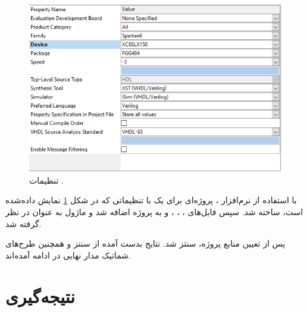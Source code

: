 \documentclass[conference]{IEEEtran-ModifiedForMVIP}
\begin{document}
\begin{figure}[t]
\centering
\includegraphics[width=\linewidth]{Images/FPGASettings.png}
\caption{
\centering
تنظیمات
.
}\label{fig:FPGASettings}
\end{figure}

با استفاده از نرم‌افزار
،
پروژه‌ای برای یک
با تنظیماتی که در شکل
\ref{fig:FPGASettings}
نمایش داده‌شده است، ساخته شد.
سپس فایل‌های
،
،
،
و
به
پروژه اضافه شد و
ماژول
به عنوان
در نظر گرفته شد.

پس از تعیین منابع پروژه،
سنتز شد.
نتایج بدست آمده از سنتز و همچنین طرح‌های شماتیک مدار نهایی در ادامه آمده‌اند.


\section{نتیجه‌گیری}



\newpage
‌

\end{document}
